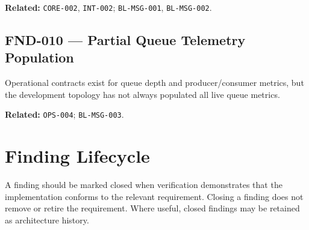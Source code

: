 \textbf{Related:} \texttt{CORE-002}, \texttt{INT-002}; \texttt{BL-MSG-001}, \texttt{BL-MSG-002}.

\subsection{FND-010 --- Partial Queue Telemetry Population}
Operational contracts exist for queue depth and producer/consumer metrics, but the development topology has not always populated all live queue metrics.

\textbf{Related:} \texttt{OPS-004}; \texttt{BL-MSG-003}.

\section{Finding Lifecycle}

A finding should be marked closed when verification demonstrates that the implementation conforms to the relevant requirement. Closing a finding does not remove or retire the requirement. Where useful, closed findings may be retained as architecture history.
